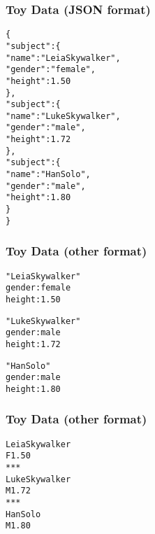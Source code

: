 \documentclass[12pt]{beamer}\usepackage[]{graphicx}\usepackage[]{color}
\makeatletter
\newcommand{\hlnum}[1]{\textcolor[rgb]{0.686,0.059,0.569}{#1}}%
\newcommand{\hlstr}[1]{\textcolor[rgb]{0.192,0.494,0.8}{#1}}%
\newcommand{\hlopt}[1]{\textcolor[rgb]{0,0,0}{#1}}%
\newcommand{\hlstd}[1]{\textcolor[rgb]{0.345,0.345,0.345}{#1}}%
\newenvironment{kframe}{%
 \def\at@end@of@kframe{}%
 \ifinner\ifhmode%
  \def\at@end@of@kframe{\end{minipage}}%
  \begin{minipage}{\columnwidth}%
 \fi\fi%
 \def\FrameCommand##1{\hskip\@totalleftmargin \hskip-\fboxsep
 \colorbox{shadecolor}{##1}\hskip-\fboxsep
     \hskip-\linewidth \hskip-\@totalleftmargin \hskip\columnwidth}%
 \MakeFramed {\advance\hsize-\width
   \@totalleftmargin\z@ \linewidth\hsize
   \@setminipage}}%
 {\par\unskip\endMakeFramed%
 \at@end@of@kframe}
\newenvironment{knitrout}{}{} %
\makeatother
\begin{document}

\begin{frame}[fragile]
\frametitle{Toy Data (JSON format)}

\begin{knitrout}\footnotesize
{}\color{fgcolor}\begin{kframe}
\begin{alltt}
\{
  \hlstr{"subject"} : \{
    \hlstr{"name"} : \hlstr{"Leia Skywalker"},
    \hlstr{"gender"} : \hlstr{"female"},
    \hlstr{"height"} : 1.50
  \},
  \hlstr{"subject"} : \{
    \hlstr{"name"} : \hlstr{"Luke Skywalker"},
    \hlstr{"gender"} : \hlstr{"male"},
    \hlstr{"height"} : 1.72
  \},
  \hlstr{"subject"} : \{
    \hlstr{"name"} : \hlstr{"Han Solo"},
    \hlstr{"gender"} : \hlstr{"male"},
    \hlstr{"height"} : 1.80
  \}
\}
\end{alltt}
\end{kframe}
\end{knitrout}

\end{frame}


\begin{frame}[fragile]
\frametitle{Toy Data (other format)}

\begin{knitrout}\footnotesize
{}\color{fgcolor}\begin{kframe}
\begin{alltt}
\hlstr{"Leia Skywalker"}
\hlstd{gender}\hlopt{:} \hlstd{female}
\hlstd{height}\hlopt{:} \hlnum{1.50}

\hlstr{"Luke Skywalker"}
\hlstd{gender}\hlopt{:} \hlstd{male}
\hlstd{height}\hlopt{:} \hlnum{1.72}

\hlstr{"Han Solo"}
\hlstd{gender}\hlopt{:} \hlstd{male}
\hlstd{height}\hlopt{:} \hlnum{1.80}
\end{alltt}
\end{kframe}
\end{knitrout}

\end{frame}


\begin{frame}[fragile]
\frametitle{Toy Data (other format)}

\begin{knitrout}\footnotesize
{}\color{fgcolor}\begin{kframe}
\begin{alltt}
Leia Skywalker
F 1.50
***
Luke Skywalker
M 1.72
***
Han Solo
M 1.80
\end{alltt}
\end{kframe}
\end{knitrout}

\end{frame}
\end{document}
